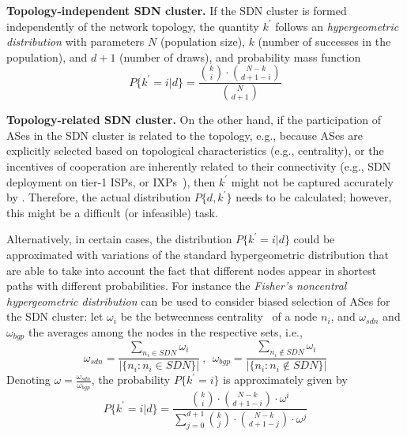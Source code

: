 \textbf{Topology-independent SDN cluster.} If the SDN cluster is formed independently of the network topology, the quantity $k^{'}$ follows an \textit{hypergeometric distribution} with parameters $N$ (population size), $k$ (number of successes in the population), and $d+1$ (number of draws), and probability mass function
\begin{equation}\label{eq:hypergeometric-distribution}
P\{k^{'}=i|d\} = \frac{\binom{k}{i}\cdot \binom{N-k}{d+1-i}}{\binom{N}{d+1}}
\end{equation}



\textbf{Topology-related SDN cluster.} On the other hand, if the participation of ASes in the SDN cluster is related to the topology, e.g., because ASes are explicitly selected based on topological characteristics (e.g.,  centrality), or the incentives of cooperation are inherently related to their connectivity (e.g., SDN deployment on tier-1 ISPs, or IXPs~\cite{Gupta-SDX-CCR-2014,Kotronis-CXP-SOSR-2016}), then $k^{'}$ might not be captured accurately by . Therefore, the actual distribution $P\{d,k^{'}\}$ needs to be calculated; however, this might be a difficult (or infeasible) task. 

Alternatively, in certain cases, the distribution $P\{k^{'}=i|d\}$ could be approximated with variations of the standard hypergeometric distribution that are able to take into account the fact that different nodes appear in shortest paths with different probabilities. For instance the \textit{Fisher's noncentral hypergeometric distribution} can be used to consider biased selection of ASes for the SDN cluster: let $\omega_{i}$ be the betweenness centrality~\cite{Newman:Networks-book} of a node $n_{i}$, and $\omega_{sdn}$ and $\omega_{bgp}$ the averages among the nodes in the respective sets, i.e., 
\begin{equation*}
\omega_{sdn} = \frac{\sum_{n_{i}\in SDN} \omega_{i}}{|\{n_{i}:n_{i}\in SDN\}|}~,~~\omega_{bgp} = \frac{\sum_{n_{i}\notin SDN} \omega_{i}}{|\{n_{i}:n_{i}\notin SDN\}|}
\end{equation*}
Denoting $\omega = \frac{\omega_{sdn}}{\omega_{bgp}}$, the probability $P\{k^{'}=i\}$ is approximately given by
\begin{equation}\label{eq:fisher-distribution}
P\{k^{'}=i|d\} = \frac{\binom{k}{i}\cdot \binom{N-k}{d+1-i}\cdot \omega^{i}}{\sum_{j = 0}^{d+1}  \binom{k}{j}\cdot \binom{N-k}{d+1-j}\cdot \omega^{j}}
\end{equation}

